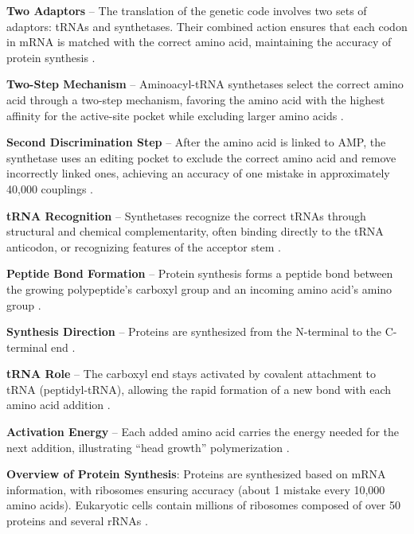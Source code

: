 \textbf{Two Adaptors} – The translation of the genetic code involves two sets of adaptors: tRNAs and synthetases. Their combined action ensures that each codon in mRNA is matched with the correct amino acid, maintaining the accuracy of protein synthesis \cite*{L1-Chapter6}.

\textbf{Two-Step Mechanism} – Aminoacyl-tRNA synthetases select the correct amino acid through a two-step mechanism, favoring the amino acid with the highest affinity for the active-site pocket while excluding larger amino acids \cite*{L1-Chapter6}.

\textbf{Second Discrimination Step} – After the amino acid is linked to AMP, the synthetase uses an editing pocket to exclude the correct amino acid and remove incorrectly linked ones, achieving an accuracy of one mistake in approximately 40,000 couplings \cite*{L1-Chapter6}.

\textbf{tRNA Recognition} – Synthetases recognize the correct tRNAs through structural and chemical complementarity, often binding directly to the tRNA anticodon, or recognizing features of the acceptor stem \cite*{L1-Chapter6}.

\textbf{Peptide Bond Formation} – Protein synthesis forms a peptide bond between the growing polypeptide's carboxyl group and an incoming amino acid's amino group \cite*{L1-Chapter6}.

\textbf{Synthesis Direction} – Proteins are synthesized from the N-terminal to the C-terminal end \cite*{L1-Chapter6}.

\textbf{tRNA Role} – The carboxyl end stays activated by covalent attachment to tRNA (peptidyl-tRNA), allowing the rapid formation of a new bond with each amino acid addition \cite*{L1-Chapter6}.

\textbf{Activation Energy} – Each added amino acid carries the energy needed for the next addition, illustrating “head growth” polymerization \cite*{L1-Chapter6}.


\textbf{Overview of Protein Synthesis}: Proteins are synthesized based on mRNA information, with ribosomes ensuring accuracy (about 1 mistake every 10,000 amino acids). Eukaryotic cells contain millions of ribosomes composed of over 50 proteins and several rRNAs \cite*{L1-Chapter6}.

